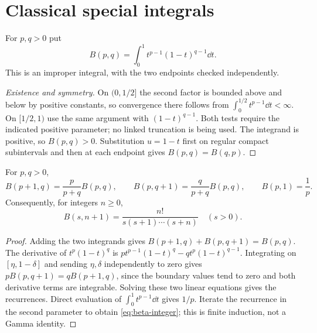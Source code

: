 \chapter{Classical special integrals}
\label{module:M03.18}

\begin{definition}
For $p,q>0$ put
\[
 B(p,q)=\int_0^1 t^{p-1}(1-t)^{q-1}\dd t.
\]
This is an improper integral, with the two endpoints checked independently.
\end{definition}
\begin{proof}[Existence and symmetry]
On $(0,1/2]$ the second factor is bounded above and below by positive constants,
so convergence there follows from $\int_0^{1/2}t^{p-1}\dd t<\infty$.
On $[1/2,1)$ use the same argument with $(1-t)^{q-1}$. Both tests require the
indicated positive parameter; no linked truncation is being used. The integrand
is positive, so $B(p,q)>0$. Substitution $u=1-t$ first on regular compact
subintervals and then at each endpoint gives $B(p,q)=B(q,p)$.
\end{proof}

\begin{proposition}
For $p,q>0$,
\[
 B(p+1,q)=\frac p{p+q}B(p,q),\qquad
 B(p,q+1)=\frac q{p+q}B(p,q),\qquad B(p,1)=\frac1p.
\]
Consequently, for integers $n\geq0$,
\begin{equation}\label{eq:beta-integer}
 B(s,n+1)=\frac{n!}{s(s+1)\cdots(s+n)}\quad(s>0).
\end{equation}
\end{proposition}
\begin{proof}
Adding the two integrands gives $B(p+1,q)+B(p,q+1)=B(p,q)$.
The derivative of $t^p(1-t)^q$ is
$pt^{p-1}(1-t)^q-qt^p(1-t)^{q-1}$. Integrating on $[\eta,1-\delta]$ and sending
$\eta,\delta$ independently to zero gives
$pB(p,q+1)=qB(p+1,q)$, since the boundary values tend to zero and both
derivative terms are integrable. Solving these two linear equations gives the
recurrences. Direct evaluation of $\int_0^1t^{p-1}\dd t$ gives $1/p$.
Iterate the recurrence in the second parameter to obtain
\eqref{eq:beta-integer}; this is finite induction, not a Gamma identity.
\end{proof}

